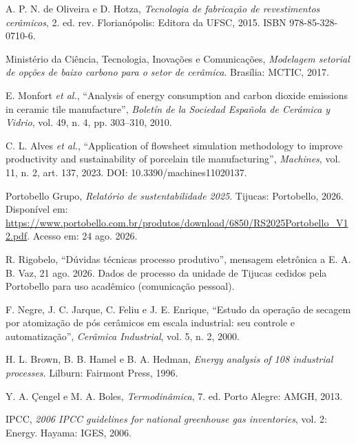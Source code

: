 
 A. P. N. de Oliveira e D. Hotza, \textit{Tecnologia de fabricação de revestimentos cerâmicos}, 2. ed. rev. Florianópolis: Editora da UFSC, 2015. ISBN 978-85-328-0710-6.

 Ministério da Ciência, Tecnologia, Inovações e Comunicações, \textit{Modelagem setorial de opções de baixo carbono para o setor de cerâmica}. Brasília: MCTIC, 2017.

 E. Monfort \textit{et al.}, ``Analysis of energy consumption and carbon dioxide emissions in ceramic tile manufacture'', \textit{Boletín de la Sociedad Española de Cerámica y Vidrio}, vol. 49, n. 4, pp. 303--310, 2010.

 C. L. Alves \textit{et al.}, ``Application of flowsheet simulation methodology to improve productivity and sustainability of porcelain tile manufacturing'', \textit{Machines}, vol. 11, n. 2, art. 137, 2023. DOI: 10.3390/machines11020137.

 Portobello Grupo, \textit{Relatório de sustentabilidade 2025}. Tijucas: Portobello, 2026. Disponível em: \url{https://www.portobello.com.br/produtos/download/6850/RS2025Portobello_V12.pdf}. Acesso em: 24 ago. 2026.

 R. Rigobelo, ``Dúvidas técnicas processo produtivo'', mensagem eletrônica a E. A. B. Vaz, 21 ago. 2026. Dados de processo da unidade de Tijucas cedidos pela Portobello para uso acadêmico (comunicação pessoal).

 F. Negre, J. C. Jarque, C. Feliu e J. E. Enrique, ``Estudo da operação de secagem por atomização de pós cerâmicos em escala industrial: seu controle e automatização'', \textit{Cerâmica Industrial}, vol. 5, n. 2, 2000.

 H. L. Brown, B. B. Hamel e B. A. Hedman, \textit{Energy analysis of 108 industrial processes}. Lilburn: Fairmont Press, 1996.

 Y. A. Çengel e M. A. Boles, \textit{Termodinâmica}, 7. ed. Porto Alegre: AMGH, 2013.

 IPCC, \textit{2006 IPCC guidelines for national greenhouse gas inventories}, vol. 2: Energy. Hayama: IGES, 2006.

